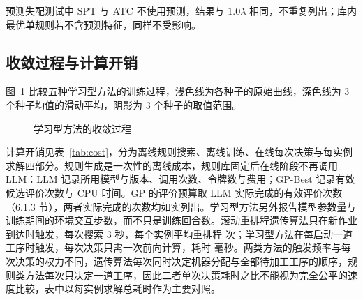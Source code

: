 预测失配测试中 SPT 与 ATC 不使用预测，结果与 $1.0\lambda$ 相同，不重复列出；库内最优单规则若不含预测特征，同样不受影响。

\subsection{收敛过程与计算开销}

图~\ref{fig:converge} 比较五种学习型方法的训练过程，浅色线为各种子的原始曲线，深色线为 3 个种子均值的滑动平均，阴影为 3 个种子的取值范围。

\begin{figure}[t]
  \centering
  \caption{学习型方法的收敛过程}\label{fig:converge}
\end{figure}

计算开销见表~\ref{tab:cost}，分为离线规则搜索、离线训练、在线每次决策与每实例求解四部分。规则生成是一次性的离线成本，规则库固定后在线阶段不再调用 LLM：LLM 记录所用模型与版本、调用次数、令牌数与费用；GP-Best 记录有效候选评价次数与 CPU 时间。GP 的评价预算取 LLM 实际完成的有效评价次数（6.1.3 节），两者实际完成的次数均如实列出。学习型方法另外报告模型参数量与训练期间的环境交互步数，而不只是训练回合数。滚动重排程遗传算法只在新作业到达时触发，每次搜索 3 秒，每个实例平均重排程 \tbd[※] 次；学习型方法在每启动一道工序时触发，每次决策只需一次前向计算，耗时 \tbd[※] 毫秒。两类方法的触发频率与每次决策的权力不同，遗传算法每次同时决定机器分配与全部待加工工序的顺序，规则类方法每次只决定一道工序，因此二者单次决策耗时之比不能视为完全公平的速度比较，表中以每实例求解总耗时作为主要对照。

